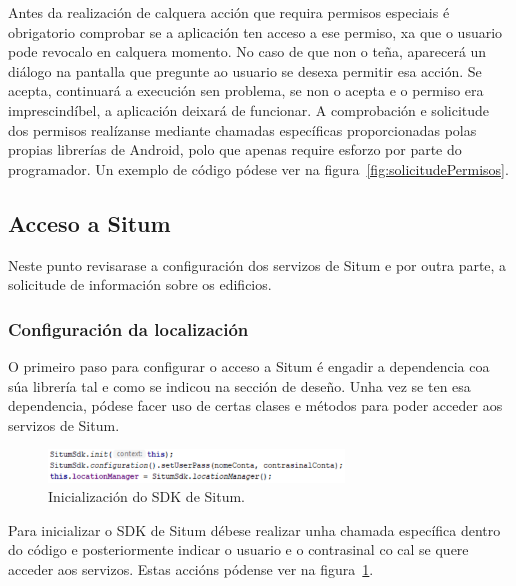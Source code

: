Antes da realización de calquera acción que requira permisos especiais é obrigatorio comprobar se a aplicación ten acceso a ese permiso, xa que o usuario pode revocalo en calquera momento. No caso de que non o teña, aparecerá un diálogo na pantalla que pregunte ao usuario se desexa permitir esa acción. Se acepta, continuará a execución sen problema, se non o acepta e o permiso era imprescindíbel, a aplicación deixará de funcionar. A comprobación e solicitude dos permisos realízanse mediante chamadas específicas proporcionadas polas propias librerías de Android, polo que apenas require esforzo por parte do programador. Un exemplo de código pódese ver na figura~\ref{fig:solicitudePermisos}.


\subsection{Acceso a Situm}
Neste punto revisarase a configuración dos servizos de Situm \cite{situmGuiaRapida} e por outra parte, a solicitude de información sobre os edificios.

\subsubsection{Configuración da localización}
O primeiro paso para configurar o acceso a Situm é engadir a dependencia coa súa librería tal e como se indicou na sección de deseño. Unha vez se ten esa dependencia, pódese facer uso de certas clases e métodos para poder acceder aos servizos de Situm.

\begin{figure}[htb] 
	\begin{center}
		\includegraphics[width=0.7\textwidth]{figures/codigo/situmInicio}
		\caption{Inicialización do SDK de Situm.}
		\label{fig:situmInicio}
	\end{center}
\end{figure}

Para inicializar o SDK de Situm débese realizar unha chamada específica dentro do código e posteriormente indicar o usuario e o contrasinal co cal se quere acceder aos servizos. Estas accións pódense ver na figura~\ref{fig:situmInicio}.

